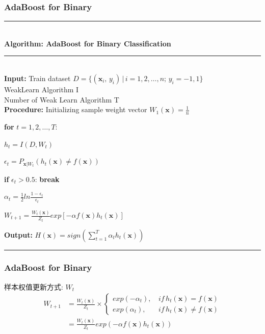 \documentclass[usenames,dvipsnames]{beamer}
\begin{document}
\begin{frame}
\frametitle{AdaBoost for Binary}
\noindent\rule[0.1\baselineskip]{\textwidth}{0.75pt}\\
  \textbf{Algorithm: AdaBoost for Binary Classification}\\
  \noindent\rule[0.1\baselineskip]{\textwidth}{0.5pt}\\
  \textbf{Input:} Train dataset $D = \{(\textbf{x}_i,\,y_i)\,|\,i = 1, 2,\dots, n;\, y_i = -1, 1\}$\\
  \hspace*{32pt} WeakLearn Algorithm I\\
  \hspace*{32pt} Number of Weak Learn Algorithm T\\
  \textbf{Procedure:} 
      \hspace*{1pt} Initializing sample weight vector $W_1(\textbf{x}) = \frac{1}{n}$\par
      \hspace*{58pt} \textbf{for} $t = 1, 2,\dots, T$:\par
          \hspace*{76pt} $h_t = I(D, W_t)$\par
          \hspace*{76pt} $\epsilon_t = P_{\textbf{x}|W_t}(h_t(\textbf{x}) \neq f(\textbf{x}))$\par
          \hspace*{76pt} \textbf{if} $\epsilon_t > 0.5$: \textbf{break}\par
          \hspace*{76pt} $\alpha_t = \frac{1}{2}ln\frac{1-\epsilon_t}{\epsilon_t}$\par
          \hspace*{76pt} $W_{t+1} = \frac{W_t(\textbf{x})}{Z_t}exp[-\alpha f(\textbf{x})h_t(\textbf{x})]$\par
  \textbf{Output:} $H(\textbf{x}) = sign(\sum_{t=1}^{T}\alpha_th_t(\textbf{x}))$\par
  \noindent\rule[0.25\baselineskip]{\textwidth}{0.75pt}\par
\end{frame} 
\begin{frame}
\frametitle{AdaBoost for Binary} 
样本权值更新方式: $W_t$
\begin{align*}
  W_{t+1} & = \frac{W_t(\textbf{x})}{Z_t}\times \left \{\begin{array}{ll}
                            exp(-\alpha_t),\, & if\, h_t(\textbf{x})=f(\textbf{x})\\
                              exp(\alpha_t),\, & if\, h_t(\textbf{x})\neq f(\textbf{x})
                            \end{array} \right. \\
        & = \frac{W_t(\textbf{x})}{Z_t}exp(-\alpha f(\textbf{x})h_t(\textbf{x}))
\end{align*}
\end{frame}    
\end{document}
